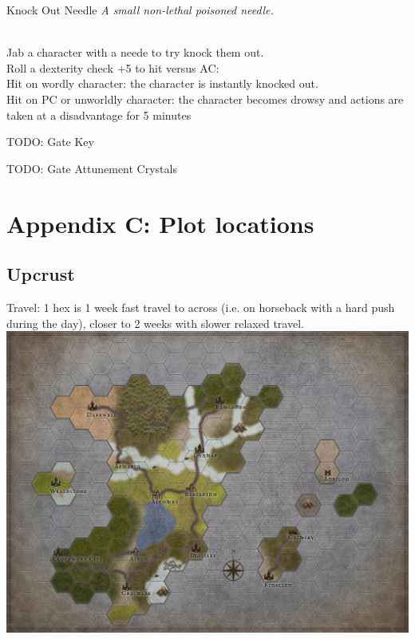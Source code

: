 \documentclass[10pt,twoside,twocolumn]{article}
\begin{document}
\begin{itembox}{Knock Out Needle}
	\textit{A small non-lethal poisoned needle.}\\
	\hline \\[1mm]
	\begin{itemaction}
		Jab a character with a neede to try knock them out.\\
		Roll a dexterity check +5 to hit versus AC:\\
		Hit on wordly character: the character is instantly knocked out.\\
		Hit on PC or unworldly character: the character becomes drowsy and actions are taken at a disadvantage for 5 minutes
	\end{itemaction}
\end{itembox}

TODO: Gate Key

TODO: Gate Attunement Crystals

\clearpage

\section{Appendix C: Plot locations}

\subsection{Upcrust}

Travel: 1 hex is 1 week fast travel to across (i.e. on horseback with a hard push during the day), closer to 2 weeks with slower relaxed travel. \\

\includegraphics[width=\textwidth]{Images/Maps/Upcrust}
\end{document}
